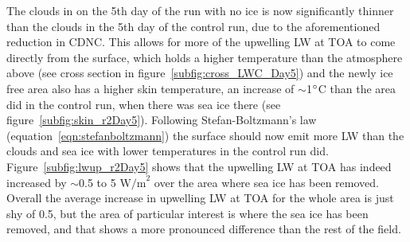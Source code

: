 The clouds in on the 5th day of the run with no ice is now significantly thinner than the clouds in the 5th day of the control run, due to the aforementioned reduction in CDNC. This allows for more of the upwelling LW at TOA to come directly from the surface, which holds a higher temperature than the atmosphere above (see cross section in figure~\ref{subfig:cross_LWC_Day5}) and the newly ice free area also has a higher skin temperature, an increase of $\sim$1$\degree$C than the area did in the control run, when there was sea ice there (see figure~\ref{subfig:skin_r2Day5}). Following Stefan-Boltzmann's law (equation~\ref{eqn:stefanboltzmann}) the surface should now emit more LW than the clouds and sea ice with lower temperatures in the control run did. Figure~\ref{subfig:lwup_r2Day5} shows that the upwelling LW at TOA has indeed increased by $\sim$0.5 to 5 $\text{W/m}^2$ over the area where sea ice has been removed. Overall the average increase in upwelling LW at TOA for the whole area is just shy of 0.5, but the area of particular interest is where the sea ice has been removed, and that shows a more pronounced difference than the rest of the field.

